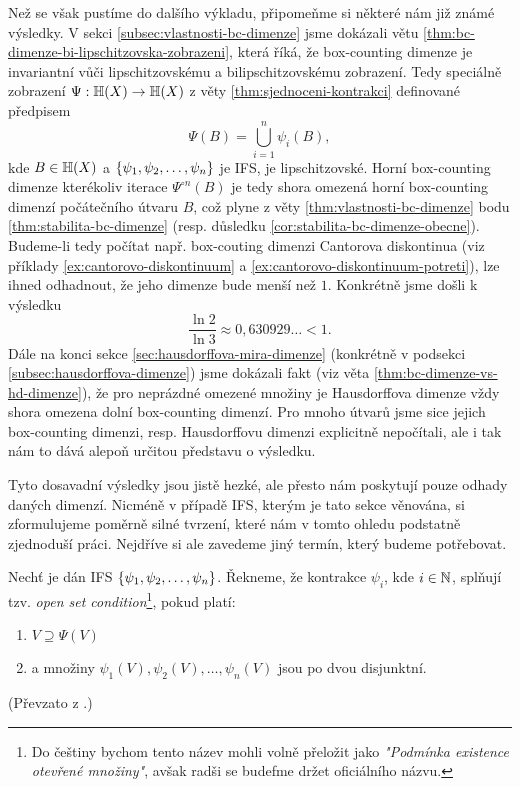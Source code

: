 Než se však pustíme do dalšího výkladu, připomeňme si některé nám již známé výsledky. V sekci \ref{subsec:vlastnosti-bc-dimenze} jsme dokázali větu \ref{thm:bc-dimenze-bi-lipschitzovska-zobrazeni}, která říká, že box-counting dimenze je invariantní vůči lipschitzovskému a bilipschitzovskému zobrazení. Tedy speciálně zobrazení $\Psi:\mathbb{H}(X) \rightarrow \mathbb{H}(X)$ z věty \ref{thm:sjednoceni-kontrakci} definované předpisem
\[\Psi(B)=\bigcup_{i=1}^n\psi_i(B),\]
kde $B\in\mathbb{H}(X)$ a $\left\{\psi_1,\psi_2,\ldots,\psi_n\right\}$ je IFS, je lipschitzovské. Horní box-counting dimenze kterékoliv iterace $\Psi^{\circ n}(B)$ je tedy shora omezená horní box-counting dimenzí počátečního útvaru $B$, což plyne z věty \ref{thm:vlastnosti-bc-dimenze} bodu \ref{thm:stabilita-bc-dimenze} (resp. důsledku \ref{cor:stabilita-bc-dimenze-obecne}). Budeme-li tedy počítat např. box-couting dimenzi Cantorova diskontinua (viz příklady \ref{ex:cantorovo-diskontinuum} a \ref{ex:cantorovo-diskontinuum-potreti}), lze ihned odhadnout, že jeho dimenze bude menší než $1$. Konkrétně jsme došli k výsledku
\[\dfrac{\ln{2}}{\ln{3}}\approx0{,}630929\ldots<1.\]
Dále na konci sekce \ref{sec:hausdorffova-mira-dimenze} (konkrétně v podsekci \ref{subsec:hausdorffova-dimenze}) jsme dokázali fakt (viz věta \ref{thm:bc-dimenze-vs-hd-dimenze}), že pro neprázdné omezené množiny je Hausdorffova dimenze vždy shora omezena dolní box-counting dimenzí. Pro mnoho útvarů jsme sice jejich box-counting dimenzi, resp. Hausdorffovu dimenzi explicitně nepočítali, ale i tak nám to dává alepoň určitou představu o výsledku.

Tyto dosavadní výsledky jsou jistě hezké, ale přesto nám poskytují pouze odhady daných dimenzí. Nicméně v případě IFS, kterým je tato sekce věnována, si zformulujeme poměrně silné tvrzení, které nám v tomto ohledu podstatně zjednoduší práci. Nejdříve si ale zavedeme jiný termín, který budeme potřebovat.
\begin{definition}\label{def:open-set-condition}
    Nechť je dán IFS $\left\{\psi_1,\psi_2,\ldots,\psi_n\right\}$. Řekneme, že kontrakce $\psi_i$, kde $i\in\mathbb{N}$, splňují tzv. \emph{open set condition}\footnote{Do češtiny bychom tento název mohli volně přeložit jako \emph{"Podmínka existence otevřené množiny"}, avšak radši se budefme držet oficiálního názvu.}, pokud platí:
    \begin{enumerate}[label=(\alph*)]
        \item $V\supseteq\Psi(V)$
        \item a množiny $\psi_1(V),\psi_2(V),\ldots,\psi_n(V)$ jsou po dvou disjunktní.
    \end{enumerate}
\end{definition}
(Převzato z \citep[str. 139]{Falconer1989}.)

